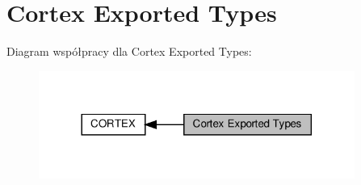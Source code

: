 \hypertarget{group___c_o_r_t_e_x___exported___types}{}\section{Cortex Exported Types}
\label{group___c_o_r_t_e_x___exported___types}
Diagram współpracy dla Cortex Exported Types\+:\nopagebreak
\begin{figure}[H]
\begin{center}
\leavevmode
\includegraphics[width=293pt]{group___c_o_r_t_e_x___exported___types}
\end{center}
\end{figure}
